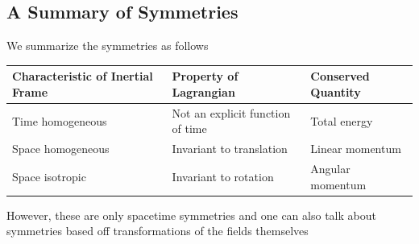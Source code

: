 \subsection{A Summary of Symmetries}
We summarize the symmetries as follows
\begin{center}
\begin{tabularx}{0.99\textwidth} { 
		| >{\raggedright\arraybackslash}X 
		| >{\centering\arraybackslash}X 
		| >{\raggedleft\arraybackslash}X | }
	\hline
\textbf{Characteristic of Inertial Frame} & \textbf{Property of Lagrangian} & \textbf{Conserved Quantity} \\
	\hline
	Time homogeneous & Not an explicit function of time & Total energy \\
	\hline
	Space homogeneous   & Invariant to translation  & Linear momentum  \\
	\hline
	Space isotropic   & Invariant to rotation  & Angular momentum  \\
	\hline
\end{tabularx}
			\end{center}
However, these are only spacetime symmetries and one can also talk about symmetries based off transformations of the fields themselves   
